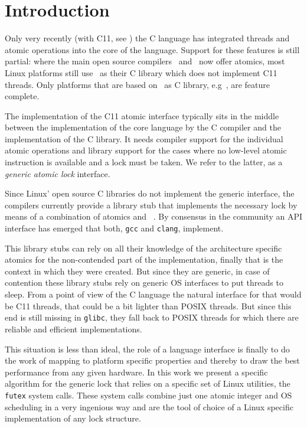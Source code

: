 
\section{Introduction}
\label{sec-1}

Only very recently (with C11, see \citeauthor{C11}) the C language has
integrated threads and atomic operations into the core of the
language.  Support for these features is still partial: where the
main open source compilers~\citeauthor{gcc} and~\citeauthor{clang} now offer atomics, most Linux
platforms still use~\citeauthor{glibc}
as their C library which does not implement C11 threads. Only
platforms that are based on~\citeauthor{musl} as C
library, e.g~\citeauthor{alpine}, are
feature complete.

The implementation of the C11 atomic interface typically sits in the
middle between the implementation of the core language by the C
compiler and the implementation of the C library. It needs compiler
support for the individual atomic operations and library support for
the cases where no low-level atomic instruction is available and a
lock must be taken. We refer to the latter, as a \emph{generic atomic
lock} interface.

Since Linux' open source C libraries do not implement the generic
interface, the compilers currently provide a library stub that
implements the necessary lock by means of a combination of atomics
and~\citeauthor{POSIX2009}
. By consensus in the community an API interface
has emerged that both, \texttt{gcc} and \texttt{clang}, implement.

This library stubs can rely on all their knowledge of the
architecture specific atomics for the non-contended part of the
implementation, finally that is the context in which they were
created. But since they are generic, in case of contention these
library stubs rely on generic OS interfaces to put threads to
sleep. From a point of view of the C language the natural interface
for that would be C11 threads, that could be a bit lighter than
POSIX threads. But since this end is still missing in \texttt{glibc}, they
fall back to POSIX threads for which there are reliable and
efficient implementations.

This situation is less than ideal, the role of a language interface
is finally to do the work of mapping to platform specific properties
and thereby to draw the best performance from any given hardware. In
this work we present a specific algorithm for the generic lock that
relies on a specific set of Linux utilities, the \texttt{futex} system
calls. These system calls combine just one atomic integer and OS
scheduling in a very ingenious way and are the tool of choice of a
Linux specific implementation of any lock structure.

